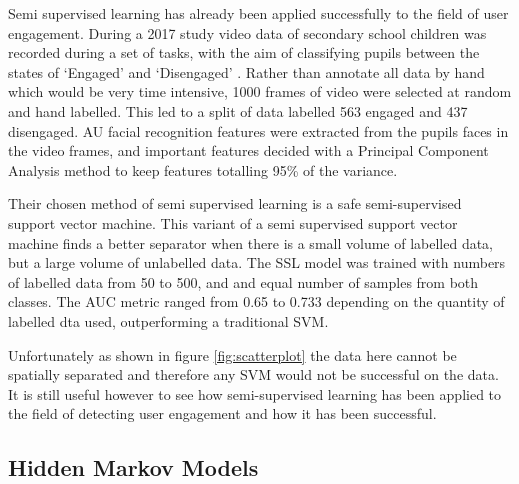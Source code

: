 \documentclass{article}
\begin{document}
Semi supervised learning has already been applied successfully to the field of user engagement.
During a 2017 study video data of secondary school children was recorded during a set of tasks, with the aim of classifying pupils between the states of `Engaged' and `Disengaged' \cite{nezami2017semi}.
Rather than annotate all data by hand which would be very time intensive, 1000 frames of video were selected at random and hand labelled.
This led to a split of data labelled 563 engaged and 437 disengaged.
AU facial recognition features were extracted from the pupils faces in the video frames, and important features decided with a Principal Component Analysis method to keep features totalling 95\% of the variance.

Their chosen method of semi supervised learning is a safe semi-supervised support vector machine.
This variant of a semi supervised support vector machine finds a better separator when there is a small volume of labelled data, but a large volume of unlabelled data.
The SSL model was trained with numbers of labelled data from 50 to 500, and and equal number of samples from both classes.
The AUC metric ranged from 0.65 to 0.733 depending on the quantity of labelled dta used, outperforming a traditional SVM.

Unfortunately as shown in figure \ref{fig:scatterplot} the data here cannot be spatially separated and therefore any SVM would not be successful on the data. 
It is still useful however to see how semi-supervised learning has been applied to the field of detecting user engagement and how it has been successful.

%   

\subsection{Hidden Markov Models}

\end{document}
